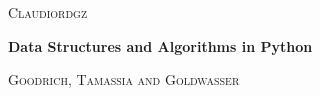 \newcommand{\HRule}{\rule{\linewidth}{0.2mm}}
\begin{titlepage}
\begin{center}

\begin{LOGOWEBPAGE}

\end{LOGOWEBPAGE}
\begin{navbartext}
	\textsc{Claudiordgz}\\[0.1cm]
\end{navbartext}
\vfill
\begin{navbartext}
	\fontsize{80}{90} \bfseries Data Structures and Algorithms in Python\\[1cm]
\end{navbartext}
\begin{navbartext}
	\huge \textsc{Goodrich, Tamassia and Goldwasser}\\[0.1cm]
\end{navbartext}

\end{center}
\end{titlepage}
